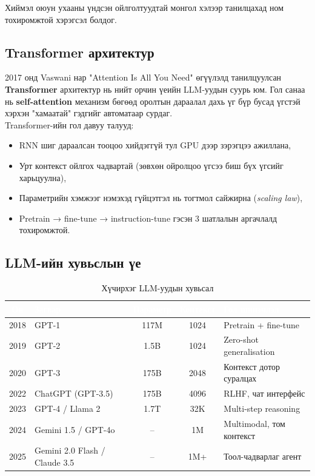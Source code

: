 Хиймэл оюун ухааны үндсэн ойлголтуудтай монгол хэлээр танилцахад \cite{mn_aimongol} ном тохиромжтой хэрэгсэл болдог.

\subsection{Transformer архитектур}
2017 онд Vaswani нар "Attention Is All You Need" \cite{transformer} өгүүлэлд танилцуулсан \textbf{Transformer} архитектур нь нийт орчин үеийн LLM-уудын суурь юм. Гол санаа нь \textbf{self-attention} механизм бөгөөд оролтын дараалал дахь үг бүр бусад үгстэй хэрхэн "хамаатай" гэдгийг автоматаар сурдаг.\\

Transformer-ийн гол давуу талууд:
\begin{itemize}
    \item RNN шиг дараалсан тооцоо хийдэггүй тул GPU дээр зэрэгцээ ажиллана,
    \item Урт контекст ойлгох чадвартай (зөвхөн ойролцоо үгсээ биш бүх үгсийг харьцуулна),
    \item Параметрийн хэмжээг нэмэхэд гүйцэтгэл нь тогтмол сайжирна (\emph{scaling law}),
    \item Pretrain → fine-tune → instruction-tune гэсэн 3 шатлалын аргачлалд тохиромжтой.
\end{itemize}

\subsection{LLM-ийн хувьслын үе}

\begin{table}[ht]
\centering
\footnotesize
\renewcommand{\arraystretch}{1.25}
\begin{tabular}{|c|p{2.7cm}|c|c|p{4.3cm}|}
\hline
\rowcolor{darknavy}
\textcolor{white}{\textbf{Он}} & \textcolor{white}{\textbf{Загвар}} & \textcolor{white}{\textbf{Параметр}} & \textcolor{white}{\textbf{Контекст}} & \textcolor{white}{\textbf{Гол шинэчлэл}} \\ \hline
2018 & GPT-1            & 117M  & 1024 & Pretrain + fine-tune \\ \hline
2019 & GPT-2            & 1.5B  & 1024 & Zero-shot generalisation \\ \hline
2020 & GPT-3            & 175B  & 2048 & Контекст дотор суралцах \\ \hline
2022 & ChatGPT (GPT-3.5)& 175B  & 4096 & RLHF, чат интерфейс \\ \hline
2023 & GPT-4 / Llama 2  & 1.7T  & 32K  & Multi-step reasoning \\ \hline
2024 & Gemini 1.5 / GPT-4o & --  & 1M   & Multimodal, том контекст \\ \hline
2025 & Gemini 2.0 Flash / Claude 3.5 & -- & 1M+ & Тоол-чадварлаг агент \\ \hline
\end{tabular}
\caption{Хүчирхэг LLM-уудын хувьсал}
\label{tab:llm-evolve}
\end{table}

